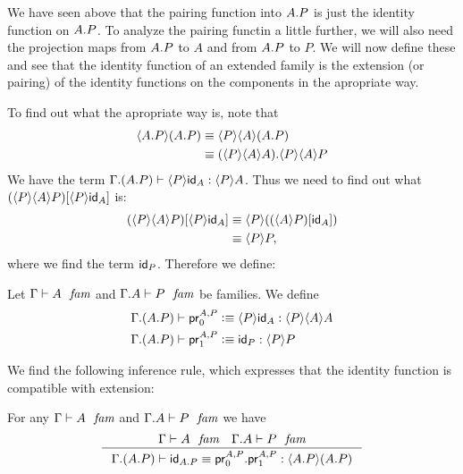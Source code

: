 We have seen above that the pairing function into $\ctxext{A}{P}$ is just the identity function on
$\ctxext{A}{P}$. To analyze the pairing functin a little further, we will also
need the projection maps from $\ctxext{A}{P}$ to $A$ and from $\ctxext{A}{P}$
to $P$. We will now define these and see that the identity function of an
extended family is the extension (or pairing) of the identity
functions on the components in the apropriate way.

To find out what the
apropriate way is, note that
\begin{align*}
\ctxwk{\ctxext{A}{P}}{\ctxext{A}{P}} & \jdeq \ctxwk{P}{{A}{\ctxext{A}{P}}}\\
& \jdeq \ctxext{\ctxwk{P}{{A}{A}}}{\ctxwk{P}{{A}{P}}}
\end{align*}
We have the term $\jterm{{\Gamma}{{A}{P}}}{\ctxwk{P}{A}}{\ctxwk{P}{\idfunc[A]}}$.
Thus we need to find out what $\subst{\ctxwk{P}{\idfunc[A]}}{\ctxwk{P}{{A}{P}}}$ is:
\begin{align*}
\subst{\ctxwk{P}{\idfunc[A]}}{\ctxwk{P}{{A}{P}}} & \jdeq \ctxwk{P}{\subst{\idfunc[A]}{\ctxwk{A}{P}}}\\
& \jdeq \ctxwk{P}{P},
\end{align*}
where we find the term $\idfunc[P]$. Therefore we define:

\begin{defn}
Let $\jfam{\Gamma}{A}$ and $\jfam{{\Gamma}{A}}{P}$ be families. We define
\begin{align*}
\jtermdefn*{\ctxext{\Gamma}{{A}{P}}}{\ctxwk{P}{{A}{A}}}{\cprojfstf{A}{P}}{\ctxwk{P}{\idfunc[A]}}\\
\jtermdefn*{\ctxext{\Gamma}{{A}{P}}}{\ctxwk{P}{P}}{\cprojsndf{A}{P}}{\idfunc[P]}
\end{align*}
\end{defn}

We find the following inference rule, which expresses that the identity function
is compatible with extension:

\begin{lem}
For any $\jfam{\Gamma}{A}$ and $\jfam{{\Gamma}{A}}{P}$ we have
\begin{equation}\label{idfunc-ext-comp}
\inference{\jfam{\Gamma}{A}\quad\jfam{{\Gamma}{A}}{P}}{\jtermeq{{\Gamma}{{A}{P}}}{\ctxwk{\ctxext{A}{P}}{\ctxext{A}{P}}}{\idfunc[\ctxext{A}{P}]}{\ctxext{\cprojfstf{A}{P}}{\cprojsndf{A}{P}}}}
\end{equation}
\end{lem}

